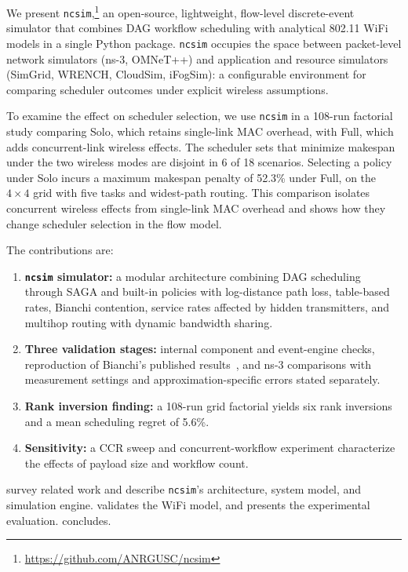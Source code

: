 \documentclass[conference]{IEEEtran}
\newcommand{\ncsim}{\texttt{ncsim}}
\begin{document}
We present \ncsim{},\footnote{\url{https://github.com/ANRGUSC/ncsim}}
an open-source, lightweight, flow-level discrete-event simulator that
combines DAG workflow scheduling with analytical 802.11 WiFi
models in a single Python package.  \ncsim{} occupies the
space between packet-level network simulators (ns-3, OMNeT++) and
application and resource simulators (SimGrid, WRENCH, CloudSim, iFogSim): a configurable environment for comparing scheduler outcomes under
explicit wireless assumptions.

To examine the effect on scheduler selection, we use \ncsim{} in a
108-run factorial study comparing Solo, which retains single-link MAC
overhead, with Full, which adds concurrent-link wireless effects.
The scheduler sets that minimize makespan under the two wireless modes
are disjoint in 6 of 18 scenarios. Selecting a policy under Solo incurs a
maximum makespan penalty of 52.3\% under Full, on the $4\times4$ grid with five tasks
and widest-path routing. This comparison isolates concurrent wireless
effects from single-link MAC overhead and shows how they change scheduler
selection in the flow model.

The contributions are:

\begin{enumerate}[itemsep=2pt,leftmargin=*]
\item \textbf{\ncsim{} simulator:} a modular architecture combining DAG
  scheduling through SAGA and built-in policies with log-distance path loss,
  table-based rates, Bianchi contention, service rates affected by hidden
  transmitters, and multihop routing with dynamic bandwidth sharing.
\item \textbf{Three validation stages:} internal component and
  event-engine checks, reproduction of Bianchi's published
  results~\cite{bianchi2000}, and ns-3 comparisons with measurement
  settings and approximation-specific errors stated separately.
\item \textbf{Rank inversion finding:} a 108-run grid
  factorial yields six rank inversions and a mean scheduling regret of 5.6\%.
\item \textbf{Sensitivity:} a CCR sweep and concurrent-workflow
  experiment characterize the effects of payload size and workflow count.
\end{enumerate}

 survey related work and
describe \ncsim{}'s architecture, system model, and simulation engine.
 validates the WiFi model, and 
presents the experimental evaluation.  concludes.
\end{document}
